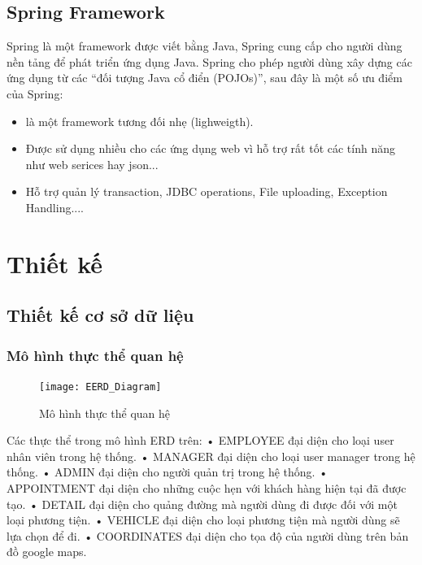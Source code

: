 \documentclass{article}
\begin{document}
\subsection{Spring Framework }
Spring là một framework được viết bằng Java, Spring cung cấp cho người dùng nền tảng để phát triển ứng dụng Java. Spring cho phép người dùng xây dựng các ứng dụng từ các
“đối tượng Java cổ điển (POJOs)”, sau đây là một số ưu điểm của Spring:
   \begin{itemize}
     \item là một framework tương đối nhẹ (lighweigth).
     \item Được sử dụng nhiều cho các ứng dụng web vì hỗ trợ rất tốt các tính năng như web serices hay json...
     \item Hỗ trợ quản lý transaction, JDBC operations, File uploading, Exception Handling....
   \end{itemize}
   
\section{Thiết kế}

\subsection{Thiết kế cơ sở dữ liệu}

\subsubsection{Mô hình thực thể quan hệ}
\begin{figure}[H]
\centering
\texttt{[image: EERD\_Diagram]}
\caption{Mô hình thực thể quan hệ}
\end{figure}

Các thực thể trong mô hình ERD trên: \newline
•	EMPLOYEE đại diện cho loại user nhân viên trong hệ thống.  \newline
•	MANAGER đại diện cho loại user manager trong hệ thống. \newline
•	ADMIN đại diện cho người quản trị trong hệ thống. \newline 
•	APPOINTMENT đại diện cho những cuộc hẹn với khách hàng hiện tại đã được tạo.\newline
•	DETAIL đại diện cho quảng đường mà người dùng đi được đối với một loại phương tiện. \newline
•	VEHICLE đại diện cho loại phương tiện mà người dùng sẽ lựa chọn để đi.\newline
•	COORDINATES đại diện cho tọa độ của người dùng trên bản đồ google maps. \newline
\end{document}
